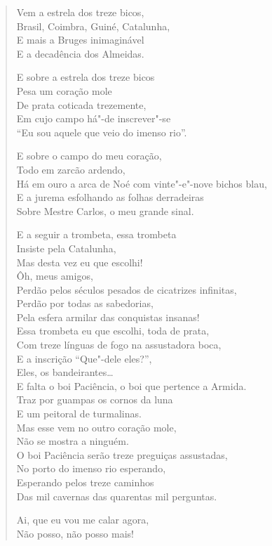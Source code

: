 \begin{verse}
Vem a estrela dos treze bicos,\\
Brasil, Coimbra, Guiné, Catalunha,\\
E mais a Bruges inimaginável\\
E a decadência dos Almeidas.

E sobre a estrela dos treze bicos\\
Pesa um coração mole\\
De prata coticada trezemente,\\
Em cujo campo há"-de inscrever"-se\\
``Eu sou aquele que veio do imenso rio''.

E sobre o campo do meu coração,\\
Todo em zarcão ardendo,\\
Há em ouro a arca de Noé com vinte"-e"-nove bichos blau,\\
E a jurema esfolhando as folhas derradeiras\\
Sobre Mestre Carlos, o meu grande sinal.

E a seguir a trombeta, essa trombeta\\
Insiste pela Catalunha,\\
Mas desta vez eu que escolhi!\\
Ôh, meus amigos,\\
Perdão pelos séculos pesados de cicatrizes infinitas,\\
Perdão por todas as sabedorias,\\
Pela esfera armilar das conquistas insanas!\\
Essa trombeta eu que escolhi, toda de prata,\\
Com treze línguas de fogo na assustadora boca,\\
E a inscrição ``Que"-dele eles?'',\\
Eles, os bandeirantes\ldots{}\\
E falta o boi Paciência, o boi que pertence a Armida.\\
Traz por guampas os cornos da luna\\
E um peitoral de turmalinas.\\
Mas esse vem no outro coração mole,\\
Não se mostra a ninguém.\\
O boi Paciência serão treze preguiças assustadas,\\
No porto do imenso rio esperando,\\
Esperando pelos treze caminhos\\
Das mil cavernas das quarentas mil perguntas.

Ai, que eu vou me calar agora,\\
Não posso, não posso mais!
\end{verse}

